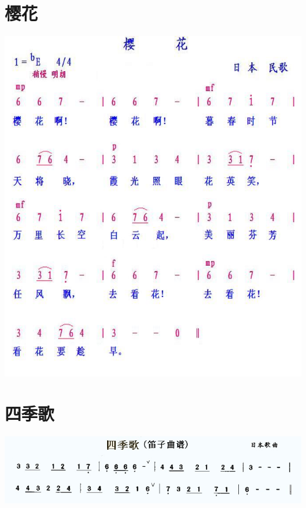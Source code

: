 \documentclass[cn,pad,chinesefont=nofont]{elegantbook}
\begin{document}
\section{樱花}
	\includegraphics[width=\textwidth]{dongxiao/日本-樱花.jpg}  
\section{四季歌}
    \includegraphics[width=\textwidth]{dongxiao/20200628-日本-四季歌}   
\end{document}
